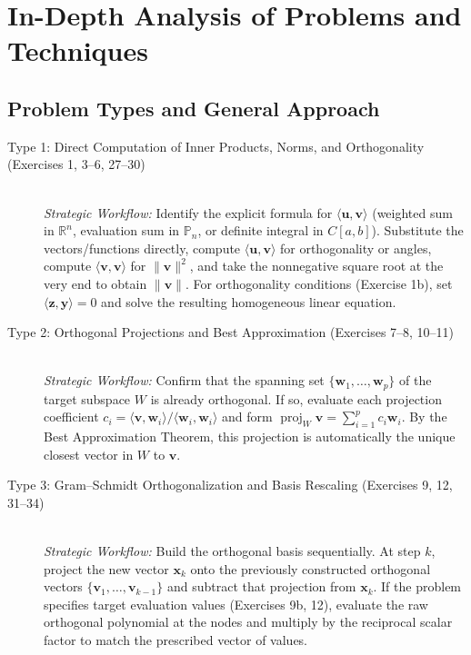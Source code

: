 \documentclass[11pt, letterpaper]{article}
\theoremstyle{definition}
\theoremstyle{remark}
\begin{document}
\newpage
\section{In-Depth Analysis of Problems and Techniques}

\subsection{Problem Types and General Approach}

\begin{description}
    \item[Type 1: Direct Computation of Inner Products, Norms, and Orthogonality (Exercises 1, 3--6, 27--30)] \leavevmode \\
    \emph{Strategic Workflow:} Identify the explicit formula for $\langle \mathbf{u}, \mathbf{v} \rangle$ (weighted sum in $\mathbb{R}^n$, evaluation sum in $\mathbb{P}_n$, or definite integral in $C[a, b]$). Substitute the vectors/functions directly, compute $\langle \mathbf{u}, \mathbf{v} \rangle$ for orthogonality or angles, compute $\langle \mathbf{v}, \mathbf{v} \rangle$ for $\|\mathbf{v}\|^2$, and take the nonnegative square root at the very end to obtain $\|\mathbf{v}\|$. For orthogonality conditions (Exercise 1b), set $\langle \mathbf{z}, \mathbf{y} \rangle = 0$ and solve the resulting homogeneous linear equation.

    \item[Type 2: Orthogonal Projections and Best Approximation (Exercises 7--8, 10--11)] \leavevmode \\
    \emph{Strategic Workflow:} Confirm that the spanning set $\{\mathbf{w}_1, \dots, \mathbf{w}_p\}$ of the target subspace $W$ is already orthogonal. If so, evaluate each projection coefficient $c_i = \langle \mathbf{v}, \mathbf{w}_i \rangle / \langle \mathbf{w}_i, \mathbf{w}_i \rangle$ and form $\operatorname{proj}_W \mathbf{v} = \sum_{i=1}^p c_i \mathbf{w}_i$. By the Best Approximation Theorem, this projection is automatically the unique closest vector in $W$ to $\mathbf{v}$.

    \item[Type 3: Gram--Schmidt Orthogonalization and Basis Rescaling (Exercises 9, 12, 31--34)] \leavevmode \\
    \emph{Strategic Workflow:} Build the orthogonal basis sequentially. At step $k$, project the new vector $\mathbf{x}_k$ onto the previously constructed orthogonal vectors $\{\mathbf{v}_1, \dots, \mathbf{v}_{k-1}\}$ and subtract that projection from $\mathbf{x}_k$. If the problem specifies target evaluation values (Exercises 9b, 12), evaluate the raw orthogonal polynomial at the nodes and multiply by the reciprocal scalar factor to match the prescribed vector of values.


\end{description}
\end{document}
